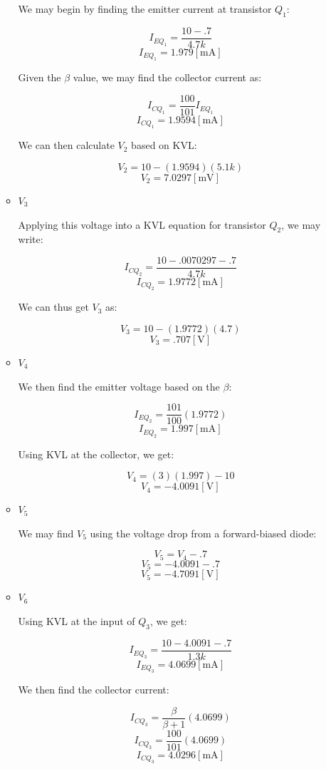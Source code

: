 \begin{enumerate}
\begin{itemize}
        We may begin by finding the emitter current at transistor $Q_1$:

        $$I_{EQ_1}=\frac{10-.7}{4.7k}$$
        $$I_{EQ_1}=1.979[\si{\milli\ampere}]$$

        Given the $\beta$ value, we may find the collector current as:

        $$I_{CQ_1}=\frac{100}{101}I_{EQ_1}$$
        $$I_{CQ_1}=1.9594[\si{\milli\ampere}]$$

        We can then calculate $V_2$ based on KVL:

        $$V_2=10-(1.9594)(5.1k)$$
        $$\boxed{V_2=7.0297[\si{\milli\volt}]}$$

      \item $V_3$

        Applying this voltage into a KVL equation for transistor $Q_2$, we may write:

        $$I_{CQ_2}=\frac{10-.0070297-.7}{4.7k}$$
        $$I_{CQ_2}=1.9772[\si{\milli\ampere}]$$

        We can thus get $V_3$ as:

        $$V_3=10-(1.9772)(4.7)$$
        $$\boxed{V_3=.707[\si{\volt}]}$$

      \item $V_4$

        We then find the emitter voltage based on the $\beta$:

        $$I_{EQ_2}=\frac{101}{100}(1.9772)$$
        $$I_{EQ_2}=1.997[\si{\milli\ampere}]$$

        Using KVL at the collector, we get:

        $$V_4=(3)(1.997)-10$$
        $$\boxed{V_4=-4.0091[\si{\volt}]}$$

      \item $V_5$

        We may find $V_5$ using the voltage drop from a forward-biased diode:

        $$V_5=V_4-.7$$
        $$V_5=-4.0091-.7$$
        $$\boxed{V_5=-4.7091[\si{\volt}]}$$

      \item $V_6$

        Using KVL at the input of $Q_3$, we get:

        $$I_{EQ_3}=\frac{10-4.0091-.7}{1.3k}$$
        $$I_{EQ_3}=4.0699[\si{\milli\ampere}]$$

        We then find the collector current:

        $$I_{CQ_3}=\frac{\beta}{\beta+1}(4.0699)$$
        $$I_{CQ_3}=\frac{100}{101}(4.0699)$$
        $$I_{CQ_3}=4.0296[\si{\milli\ampere}]$$


\end{itemize}
\end{enumerate}
